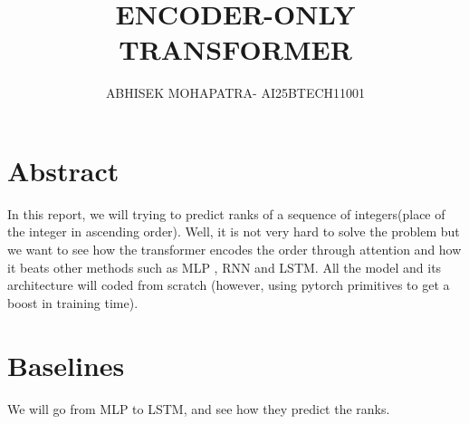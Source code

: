 \documentclass[journal,12pt,onecolumn]{IEEEtran}
\begin{document}
\title{ENCODER-ONLY TRANSFORMER}
\author{ABHISEK MOHAPATRA- AI25BTECH11001 }
{\let\newpage\relax\maketitle}

\section{Abstract}
In this report, we will trying to predict ranks of a sequence of integers(place of the integer in ascending order). Well, it is not very hard to solve the problem but we want to see how the transformer encodes the order through attention and how it beats other methods such as MLP , RNN and LSTM. All the model and its architecture will coded from scratch (however, using pytorch primitives to get a boost in training time).

\section{Baselines}
We will go from MLP to LSTM, and see how they predict the ranks.
\end{document}
